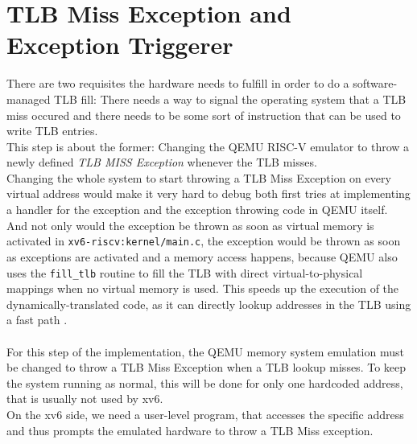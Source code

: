 \section{TLB Miss Exception and Exception Triggerer }
There are two requisites the hardware needs to fulfill in order to do a software-managed TLB fill:
There needs a way to signal the operating system that a TLB miss occured and there needs to be some
sort of instruction that can be used to write TLB entries.\\
This step is about the former: Changing the QEMU RISC-V emulator to throw a newly defined \textit{
    TLB MISS Exception} whenever the TLB misses.\\
Changing the whole system to start throwing a TLB Miss Exception on every virtual address would
make it very hard to debug both first tries at implementing a handler for the exception and the
exception throwing code in QEMU itself.\\
And not only would the exception be thrown as soon as virtual memory is activated in
\texttt{xv6-riscv:kernel/main.c}, the exception would be thrown
as soon as exceptions are activated and a memory access happens, because QEMU also uses the
\texttt{fill\_tlb} routine to fill the TLB with direct
virtual-to-physical mappings when no virtual memory is used. This speeds up the execution of
the dynamically-translated code, as it can directly
lookup addresses in the TLB using a fast path \cite{DeepDiveQEMU}.\\ \\
For this step of the implementation, the QEMU memory system emulation must be changed to throw a
TLB Miss Exception when a TLB lookup misses. To keep the system running as normal, this will
be done for only one hardcoded address, that is usually not used by xv6.\\
On the xv6 side, we need a user-level program, that accesses the specific address and thus prompts
the emulated hardware to throw a TLB Miss exception.


